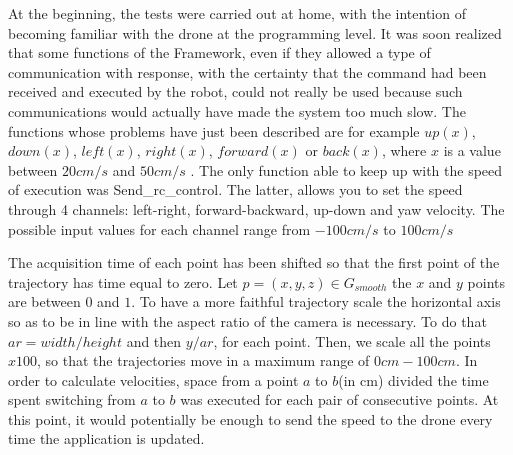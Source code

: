 \noindent At the beginning, the tests were carried out at home, with the intention of becoming familiar with the drone at the programming level. It was soon realized that some functions of the Framework, even if they allowed a type of communication with response, with the certainty that the command had been received and executed by the robot, could not really be used because such communications would actually have made the system too much slow. The functions whose problems have just been described are for example $up(x)$, $down(x)$, $left(x)$, $right(x)$, $forward(x)$ or $back(x)$, where $x$ is a value between $20cm/s$ and $50cm/s$ \cite[]{djitelloguide}. The only function able to keep up with the speed of execution was Send\_rc\_control. The latter, allows you to set the speed through 4 channels: left-right, forward-backward, up-down and yaw velocity. The possible input values for each channel range from $-100cm/s$ to $100cm/s$ 

\noindent The acquisition time of each point has been shifted so that the first point of the trajectory has time equal to zero. Let $p=(x,y,z) \in G_{smooth}$ the $x$ and $y$ points are between $0$ and $1$. To have a more faithful trajectory scale the horizontal axis so as to be in line with the aspect ratio of the camera is necessary. To do that $ar=width/height$ and then $y/ar$, for each point. Then, we scale all the points $x100$, so that the trajectories move in a maximum range of $0cm-100cm$. In order to calculate velocities, space from a point $a$ to $b$(in cm) divided the time spent switching from $a$ to $b$ was executed for each pair of consecutive points. At this point, it would potentially be enough to send the speed to the drone every time the application is updated. 


